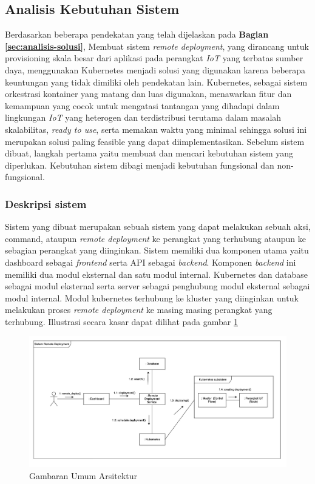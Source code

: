 \subsection{Analisis Kebutuhan Sistem}
\label{sec:analisis-kebutuhan-sistem}

Berdasarkan beberapa pendekatan yang telah dijelaskan pada \textbf{Bagian \ref{sec:analisis-solusi}}, Membuat sistem \textit{remote deployment}, yang dirancang untuk provisioning skala besar dari aplikasi pada perangkat \textit{IoT} yang terbatas sumber daya, menggunakan Kubernetes menjadi solusi yang digunakan karena beberapa keuntungan yang tidak dimiliki oleh pendekatan lain. Kubernetes, sebagai sistem orkestrasi kontainer yang matang dan luas digunakan, menawarkan fitur dan kemampuan yang cocok untuk mengatasi tantangan yang dihadapi dalam lingkungan \textit{IoT} yang heterogen dan terdistribusi terutama dalam masalah skalabilitas, \textit{ready to use}, serta memakan waktu yang minimal sehingga solusi ini merupakan solusi paling feasible yang dapat diimplementasikan. Sebelum sistem dibuat, langkah pertama yaitu membuat dan mencari kebutuhan sistem yang diperlukan. Kebutuhan sistem dibagi menjadi kebutuhan fungsional dan non-fungsional.

\subsubsection{Deskripsi sistem}
Sistem yang dibuat merupakan sebuah sistem yang dapat melakukan sebuah aksi, command, ataupun \textit{remote deployment} ke perangkat yang terhubung ataupun ke sebagian perangkat yang diinginkan. Sistem memiliki dua komponen utama yaitu dashboard sebagai \textit{frontend} serta API sebagai \textit{backend}. Komponen \textit{backend} ini memiliki dua modul eksternal dan satu modul internal. Kubernetes dan database sebagai modul eksternal serta server sebagai penghubung modul eksternal sebagai modul internal. Modul kubernetes terhubung ke kluster yang diinginkan untuk melakukan proses \textit{remote deployment} ke masing masing perangkat yang terhubung. Illustrasi secara kasar dapat dilihat pada gambar \ref{fig:gambaran-umum-arsitektur}

\begin{figure}[ht]
  \centering
  \includegraphics[width=1\textwidth]{resources/chapter-3/gambaran-umum-arsitektur-updated.jpg}
  \caption{Gambaran Umum Arsitektur}
  \label{fig:gambaran-umum-arsitektur}
\end{figure}

\pagebreak






